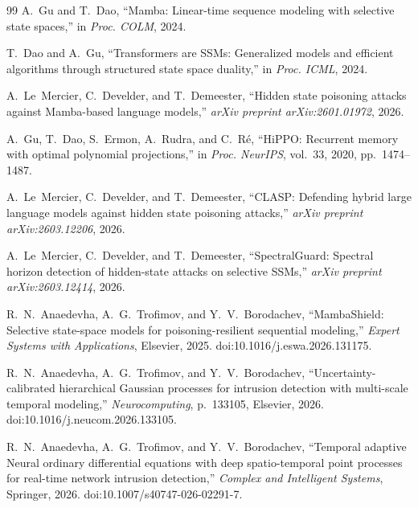 \documentclass[12pt,a4paper]{article}
\theoremstyle{definition}
\theoremstyle{remark}
\begin{document}

\begin{thebibliography}{99}
A.~Gu and T.~Dao, ``{Mamba}: Linear-time sequence modeling with selective state spaces,'' in \emph{Proc. COLM}, 2024.

T.~Dao and A.~Gu, ``Transformers are SSMs: Generalized models and efficient algorithms through structured state space duality,'' in \emph{Proc. ICML}, 2024.

A.~Le~Mercier, C.~Develder, and T.~Demeester, ``Hidden state poisoning attacks against {Mamba}-based language models,'' \emph{arXiv preprint arXiv:2601.01972}, 2026.

A.~Gu, T.~Dao, S.~Ermon, A.~Rudra, and C.~R\'e, ``HiPPO: Recurrent memory with optimal polynomial projections,'' in \emph{Proc. NeurIPS}, vol.~33, 2020, pp.~1474--1487.

A.~Le~Mercier, C.~Develder, and T.~Demeester, ``{CLASP}: Defending hybrid large language models against hidden state poisoning attacks,'' \emph{arXiv preprint arXiv:2603.12206}, 2026.

A.~Le~Mercier, C.~Develder, and T.~Demeester, ``{SpectralGuard}: Spectral horizon detection of hidden-state attacks on selective SSMs,'' \emph{arXiv preprint arXiv:2603.12414}, 2026.

R.~N.~Anaedevha, A.~G.~Trofimov, and Y.~V.~Borodachev, ``{MambaShield}: Selective state-space models for poisoning-resilient sequential modeling,'' \emph{Expert Systems with Applications}, Elsevier, 2025. doi:10.1016/j.eswa.2026.131175.

R.~N.~Anaedevha, A.~G.~Trofimov, and Y.~V.~Borodachev, ``Uncertainty-calibrated hierarchical {Gaussian} processes for intrusion detection with multi-scale temporal modeling,'' \emph{Neurocomputing}, p.~133105, Elsevier, 2026. doi:10.1016/j.neucom.2026.133105.

R.~N.~Anaedevha, A.~G.~Trofimov, and Y.~V.~Borodachev, ``Temporal adaptive Neural ordinary differential equations with deep spatio-temporal point processes for real-time network intrusion detection,'' \emph{Complex and Intelligent Systems}, Springer, 2026. doi:10.1007/s40747-026-02291-7.


\end{thebibliography}
\end{document}

